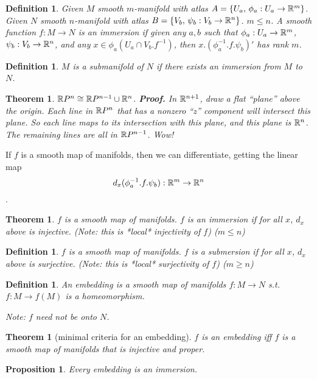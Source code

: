 \documentclass[11pt]{amsbook}
\theoremstyle{mystyle} \newtheorem{thrm}[thm]{Theorem}
\theoremstyle{mystyle} \newtheorem{defi}[thm]{Definition}
\theoremstyle{mystyle} \newtheorem{coro}[thm]{Corollary}
\theoremstyle{mystyle} \newtheorem{propo}[thm]{Proposition}
\theoremstyle{mystyle} \newtheorem{lemm}[thm]{Lemma}
\numberwithin{thm}{section}
\newcommand{\de}{\emph}
\begin{document}
\begin{defi}
	Given $M$ smooth $m$-manifold with atlas $A = \{ U_a, \,\phi_a : U_a \to {\mathbb R}^m \}$.
	Given $N$ smooth $n$-manifold with atlas $B = \{ V_b, \,\psi_b : V_b \to {\mathbb R}^n \}$.
	$m \leq n$.
	A smooth function $f : M \to N$  is an \de{immersion} if given any $a, b$ such that $\phi_a: U_a \to {\mathbb R}^m$, $\psi_b: V_b \to {\mathbb R}^n$, and any $x \in \phi_a(U_a \cap V_b.f^{-1})$, then $x.(\phi_a^{-1}.f.\psi_b)'$ has rank $m$.
\end{defi}

\begin{defi}
	$M$ is a \de{submanifold} of $N$ if there exists an immersion from $M$ to $N$.
\end{defi}

\begin{thrm}
	${\mathbb R} P^n \mathrel{\cong} {\mathbb R} P^{n-1} \cup {\mathbb R}^n$.
	\textbf{Proof.}  In ${\mathbb R}^{n+1}$, draw a flat ``plane'' above the origin.  Each line in ${\mathbb R} P^n$ that has a nonzero ``z'' component will intersect this plane.  So each line maps to its intersection with this plane, and this plane is ${\mathbb R}^n$.  The remaining lines are all in ${\mathbb R} P^{n-1}$.  Wow!
\end{thrm}



If $f$ is a smooth map of manifolds, then we can differentiate, getting the linear map $$d_x(\phi_a^{-1}.f.\psi_b): {\mathbb R}^m \to {\mathbb R}^n$$.

\begin{thrm}
	$f$ is a smooth map of manifolds.
	$f$ is an \de{immersion} if for all $x$, $d_x$ above is injective.  (Note: this is *local* injectivity of $f$) ($m \leq n$)
\end{thrm}

\begin{defi}
	$f$ is a smooth map of manifolds.
	$f$ is a \de{submersion} if for all $x$, $d_x$ above is surjective.  (Note: this is *local* surjectivity of $f$) ($m \geq n$)
\end{defi}

\begin{defi}
	An \de{embedding} is a smooth map of manifolds $f: M \to N$ s.t. $f : M \to f(M)$ is a homeomorphism.

	Note: $f$ need not be onto $N$.
\end{defi}
\begin{thrm}[minimal criteria for an embedding]
	$f$ is an \de{embedding} iff $f$ is a smooth map of manifolds that is injective and proper.
\end{thrm}
\begin{propo}
	Every embedding is an immersion.
\end{propo}
\end{document}
